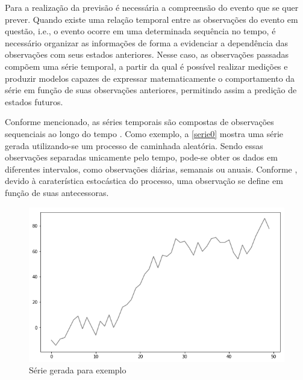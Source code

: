 \documentclass[
    12pt,
    oneside,
    a4paper,
    english,
    brazil
]{abntex2}
\begin{document}

Para a realização da previsão é necessária a compreensão do evento que se quer prever. Quando existe uma relação temporal entre as observações do evento em questão, i.e., o evento ocorre em uma determinada sequência no tempo, é necessário organizar as informações de forma a evidenciar a dependência das observações com seus estados anteriores. Nesse caso, as observações passadas compõem uma série temporal, a partir da qual é possível realizar medições e produzir modelos capazes de expressar
matematicamente o comportamento da série em função de suas observações anteriores, permitindo assim a predição de estados futuros.


Conforme mencionado, as séries temporais são compostas de observações sequenciais ao longo do tempo \cite{wiley}. Como exemplo, a \autoref{serie0} mostra uma série gerada utilizando-se um processo de caminhada aleatória.
Sendo essas observações separadas unicamente pelo tempo, pode-se obter os dados em diferentes intervalos, como observações diárias, semanais ou anuais.
Conforme , devido à caraterística estocástica do processo, uma observação se define em função de suas antecessoras.

\begin{figure}[ht]
    \centering
    \caption{Série gerada para exemplo}\label{serie0}
    \includegraphics[width=.6\linewidth]{images/serie_exemplo.png}
\end{figure}
\end{document}
